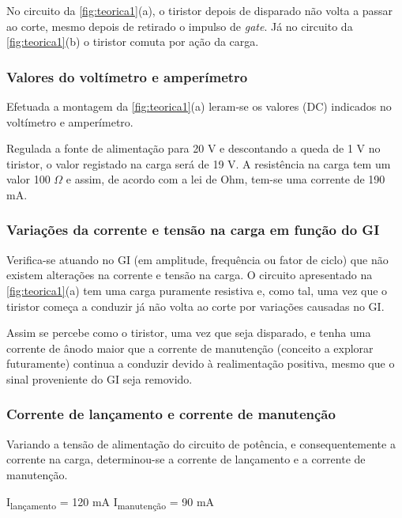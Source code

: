 \documentclass[a4paper,11pt]{article}
\numberwithin{equation}{section}
\begin{document}
No circuito da \autoref{fig:teorica1}(a), o tiristor depois de disparado não volta a passar ao corte, mesmo depois de retirado o impulso de \textit{gate}. Já no circuito da \autoref{fig:teorica1}(b) o tiristor comuta por ação da carga.

\subsubsection{Valores do voltímetro e amperímetro}

Efetuada a montagem da \autoref{fig:teorica1}(a) leram-se os valores (DC) indicados no voltímetro e amperímetro.

Regulada a fonte de alimentação para 20 V e descontando a queda de 1 V no tiristor, o valor registado na carga será de 19 V. A resistência na carga tem um valor 100 $\Omega$ e assim, de acordo com a lei de Ohm, tem-se uma corrente de 190 mA.

\subsubsection{Variações da corrente e tensão na carga em função do GI}

Verifica-se atuando no GI (em amplitude, frequência ou fator de ciclo) que não existem alterações na corrente e tensão na carga. O circuito apresentado na \autoref{fig:teorica1}(a) tem uma carga puramente resistiva e, como tal, uma vez que o tiristor começa a conduzir já não volta ao corte por variações causadas no GI.

Assim se percebe como o tiristor, uma vez que seja disparado, e tenha uma corrente de ânodo maior que a corrente de manutenção (conceito a explorar futuramente) continua a conduzir devido à realimentação positiva, mesmo que o sinal proveniente do GI seja removido. 


\subsubsection{Corrente de lançamento e corrente de manutenção}

Variando a tensão de alimentação do circuito de potência, e consequentemente a corrente na carga, determinou-se a corrente de lançamento e a corrente de manutenção.

\hspace{30mm} I\textsubscript{lançamento} = 120 mA \hspace{5mm} I\textsubscript{manutenção} = 90 mA 
\end{document}
